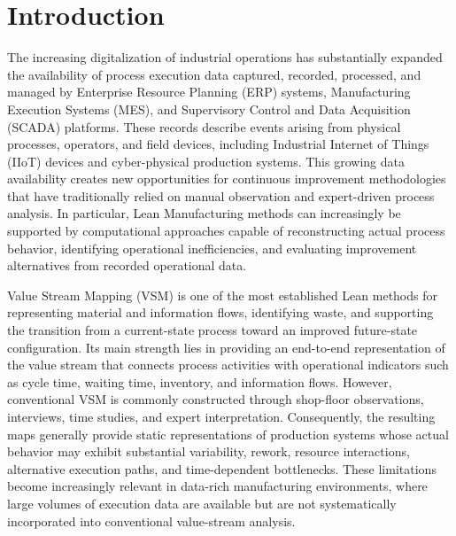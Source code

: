\documentclass[pdflatex,iicol,Numbered,sn-basic]{sn-jnl}
\begin{document}

\maketitle
\clearpage

\section{Introduction}
\label{sec:introduction}

The increasing digitalization of industrial operations has substantially
expanded the availability of process execution data captured, recorded,
processed, and managed by Enterprise Resource Planning (ERP) systems,
Manufacturing Execution Systems (MES), and Supervisory Control and Data
Acquisition (SCADA) platforms. These records describe events arising from
physical processes, operators, and field devices, including Industrial
Internet of Things (IIoT) devices and cyber-physical production systems.
This growing data availability creates new opportunities for continuous
improvement methodologies that have traditionally relied on manual observation
and expert-driven process analysis. In particular, Lean Manufacturing methods
can increasingly be supported by computational approaches capable of
reconstructing actual process behavior, identifying operational inefficiencies,
and evaluating improvement alternatives from recorded operational data.

Value Stream Mapping (VSM) is one of the most established Lean methods for
representing material and information flows, identifying waste, and supporting
the transition from a current-state process toward an improved future-state
configuration. Its main strength lies in providing an end-to-end representation
of the value stream that connects process activities with operational indicators
such as cycle time, waiting time, inventory, and information flows. However,
conventional VSM is commonly constructed through shop-floor observations,
interviews, time studies, and expert interpretation. Consequently, the resulting
maps generally provide static representations of production systems whose actual
behavior may exhibit substantial variability, rework, resource interactions,
alternative execution paths, and time-dependent bottlenecks. These limitations
become increasingly relevant in data-rich manufacturing environments, where
large volumes of execution data are available but are not systematically
incorporated into conventional value-stream analysis.
\end{document}
